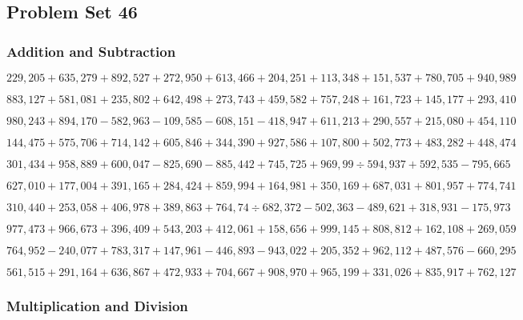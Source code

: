 \hypertarget{problem-set-46-4}{%
\subsection{Problem Set 46}\label{problem-set-46-4}}

\hypertarget{addition-and-subtraction-351}{%
\subsubsection{Addition and
Subtraction}\label{addition-and-subtraction-351}}

\(229,205+635,279+892,527+272,950+613,466+204,251+113,348+151,537+780,705+ 940,989\)

\(883,127+581,081+235,802+642,498+273,743+459,582+757,248+161,723+145,177+293,410\)

\(980,243+894,170-582,963-109,585-608,151-418,947+611,213+290,557+215,080+454,110\)

\(144,475+575,706+714,142+605,846+344,390+927,586+107,800+502,773+483,282+448,474\)

\(301,434+958,889+600,047-825,690-885,442+745,725+969,99÷594,937+592,535-795,665\)

\(627,010+177,004+391,165+284,424+859,994+164,981+350,169+687,031+801,957+774,741\)

\(310,440+253,058+406,978+389,863+764,74÷682,372-502,363-489,621+318,931-175,973\)

\(977,473+966,673+396,409+543,203+412,061+158,656+999,145+808,812+162,108+269,059\)

\(764,952-240,077+783,317+147,961-446,893-943,022+205,352+962,112+487,576-660,295\)

\(561,515+291,164+636,867+472,933+704,667+908,970+965,199+331,026+835,917+762,127\)

\hypertarget{multiplication-and-division-350}{%
\subsubsection{Multiplication and
Division}\label{multiplication-and-division-350}}


